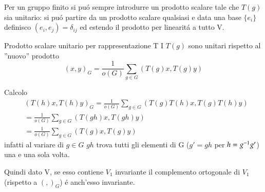 \documentclass[oneside,12pt]{memoir}
\begin{document}
Per un gruppo finito si pu\'o sempre introdurre un prodotto scalare tale che $T(g)$ sia unitario: si pu\'o partire da un prodotto scalare qualsiasi e data una base $\{e_i\}$ definisco $(e_i,e_j)=\delta_{ij}$ ed estendo il prodotto per linearit\'a a tutto V.

\begin{definition}{Prodotto scalare unitario per rappresentazione T}
I $T(g)$ sono unitari rispetto al ''nuovo'' prodotto
\begin{equation*}
(x,y)_G=\frac{1}{o(G)}\sum_{g\in G}(T(g)x,T(g)y)
\end{equation*}

\end{definition}

Calcolo
\begin{align*}
&(T(h)x,T(h)y)_G=\frac{1}{o(G)}\sum_{g\in G}(T(g)T(h)x,T(g)T(h)y)\\
&=\frac{1}{o(G)}\sum_{g\in G}(T(gh)x,T(gh)y)\\
&=\frac{1}{o(G)}\sum_{g\in G}(T(g)x,T(g)y)
\end{align*}
infatti al variare di $g\in G$ $gh$ trova tutti gli elementi di G ($g'=gh$ per $h={{g}^{-1}}g'$) una e una sola volta.

Quindi dato V, se esso contiene $V_1$ invariante il complemento ortogonale di $V_1$ (rispetto a $(,)_G$) \'e anch'esso invariante.
\end{document}
